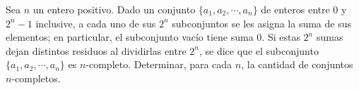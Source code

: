 Sea $n$ un entero positivo. Dado un conjunto $\{ a_1, a_2, \cdots , a_n\}$ de enteros entre $0$ y $2^n - 1$ inclusive, a cada uno de sus $2^n$ subconjuntos se les asigna la suma de sus elementos; en particular, el subconjunto vacío tiene suma $0$. Si estas $2^n$ sumas dejan distintos residuos al dividirlas entre $2^n$, se dice que el subconjunto $\{ a_1,a_2,\cdots ,a_n\}$ es $n$-completo. Determinar, para cada $n$, la cantidad de conjuntos $n$-completos.

